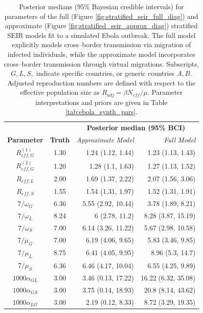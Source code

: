 \begin{table}[htbp]
	\caption[Posterior parameter estimates for full and approximate stratified SEIR models fit to a simulated Ebola outbreak.]{Posterior medians (95\% Bayesian credible intervals) for parameters of the full (Figure \ref{fig:stratified_seir_full_diag}) and approximate (Figure \ref{fig:stratified_seir_approx_diag}) stratified SEIR models fit to a simulated Ebola outbreak. The full model explicitly models cross--border transmission via migration of infected individuals, while the approximate model incorporates cross--border transmission through virtual migrations. Subscripts, $ G,L,S, $ indicate specific countries, or generic countries $ A,B $. Adjusted reproduction numbers are defined with respect to the effective population size as $ R_{adj} = \beta N_{eff} /\mu $. Parameter interpretations and priors are given in Table \ref{tab:ebola_synth_pars}.}
	\label{tab:ebola_synth_ests}
	\centering\footnotesize
	\begin{tabular}{ccrr}		
		\hline
		& & \multicolumn{2}{c}{\textbf{Posterior median (95\% BCI)}}\\\cline{3-4}
		\textbf{Parameter} & \textbf{Truth} & \textit{Approximate Model} & \textit{Full Model} \\ 
		\hline
		$ R_{eff,G}^{(1)} $& 1.30 & 1.24 (1.12, 1.44) & 1.23 (1.13, 1.43) \\ 
		$ R_{eff,G}^{(2)} $& 1.20 & 1.28 (1.1, 1.63)& 1.27 (1.13, 1.52) \\ 
		$ R_{eff,L} $& 2.00 & 1.69 (1.37, 2.22) & 2.07 (1.56, 3.06)  \\ 
		$ R_{eff,S} $& 1.55 & 1.54 (1.31, 1.97)& 1.52 (1.31, 1.91) \\ 
		$ 7/\omega_G $& 6.36 & 5.55 (2.92, 10.44)& 3.78 (1.89, 8.21)  \\ 
		$ 7/\omega_L $& 8.24 & 6 (2.78, 11.2)&  8.28 (3.87, 15.19) \\ 
		$ 7/\omega_S $& 7.00 & 6.14 (3.26, 11.22)& 5.67 (2.98, 10.58) \\ 
		$ 7/\mu_G $& 7.00 & 6.19 (4.06, 9.65)& 5.83 (3.46, 9.85) \\ 
		$ 7/\mu_L $ & 8.75 & 6.41 (4.05, 9.95) & 8.96 (5.3, 14.7) \\
		$ 7/\mu_S $& 6.36 & 6.46 (4.17, 10.04)& 6.55 (4.25, 9.89) \\ 
		$ 1000\alpha_{GL} $& 3.00 & 3.46 (0.13, 17.22) & 16.22 (6.32, 35.08) \\ 
		$ 1000\alpha_{GS} $& 3.00 & 3.75 (0.14, 18.93)& 20.8 (8.14, 43.62) \\ 
		$ 1000\alpha_{LG} $& 3.00 & 2.19 (0.12, 8.33)&  8.72 (3.29, 19.35) \\ 

\end{tabular}
\end{table}

